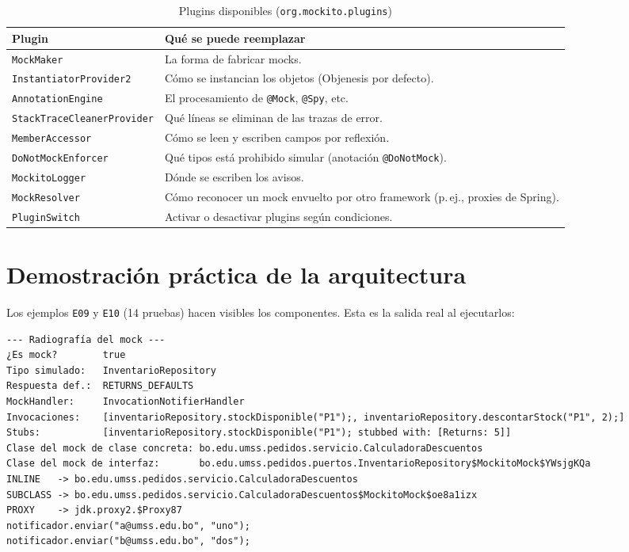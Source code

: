 \documentclass[11pt,a4paper,oneside]{report}
\newcommand{\code}[1]{\texttt{#1}}
\begin{document}
\begin{table}[H]
\centering
\caption{Plugins disponibles (\code{org.mockito.plugins})}
\begin{tabularx}{\linewidth}{lX}
\toprule
\textbf{Plugin} & \textbf{Qué se puede reemplazar}\\
\midrule
\code{MockMaker} & La forma de fabricar mocks.\\
\code{InstantiatorProvider2} & Cómo se instancian los objetos (Objenesis por defecto).\\
\code{AnnotationEngine} & El procesamiento de \code{@Mock}, \code{@Spy}, etc.\\
\code{StackTraceCleanerProvider} & Qué líneas se eliminan de las trazas de error.\\
\code{MemberAccessor} & Cómo se leen y escriben campos por reflexión.\\
\code{DoNotMockEnforcer} & Qué tipos está prohibido simular (anotación \code{@DoNotMock}).\\
\code{MockitoLogger} & Dónde se escriben los avisos.\\
\code{MockResolver} & Cómo reconocer un mock envuelto por otro framework (p.\,ej., proxies de Spring).\\
\code{PluginSwitch} & Activar o desactivar plugins según condiciones.\\
\bottomrule
\end{tabularx}
\end{table}

\section{Demostración práctica de la arquitectura}
\label{sec:demo-arquitectura}
Los ejemplos \code{E09} y \code{E10} (14 pruebas) hacen visibles los componentes. Esta es la salida real al ejecutarlos:

\begin{lstlisting}[style=bash,caption={Salida de \code{E09} y \code{E10} (consola)}]
--- Radiografía del mock ---
¿Es mock?        true
Tipo simulado:   InventarioRepository
Respuesta def.:  RETURNS_DEFAULTS
MockHandler:     InvocationNotifierHandler
Invocaciones:    [inventarioRepository.stockDisponible("P1");, inventarioRepository.descontarStock("P1", 2);]
Stubs:           [inventarioRepository.stockDisponible("P1"); stubbed with: [Returns: 5]]
Clase del mock de clase concreta: bo.edu.umss.pedidos.servicio.CalculadoraDescuentos
Clase del mock de interfaz:       bo.edu.umss.pedidos.puertos.InventarioRepository$MockitoMock$YWsjgKQa
INLINE   -> bo.edu.umss.pedidos.servicio.CalculadoraDescuentos
SUBCLASS -> bo.edu.umss.pedidos.servicio.CalculadoraDescuentos$MockitoMock$oe8a1izx
PROXY    -> jdk.proxy2.$Proxy87
notificador.enviar("a@umss.edu.bo", "uno");
notificador.enviar("b@umss.edu.bo", "dos");
\end{lstlisting}
\end{document}

